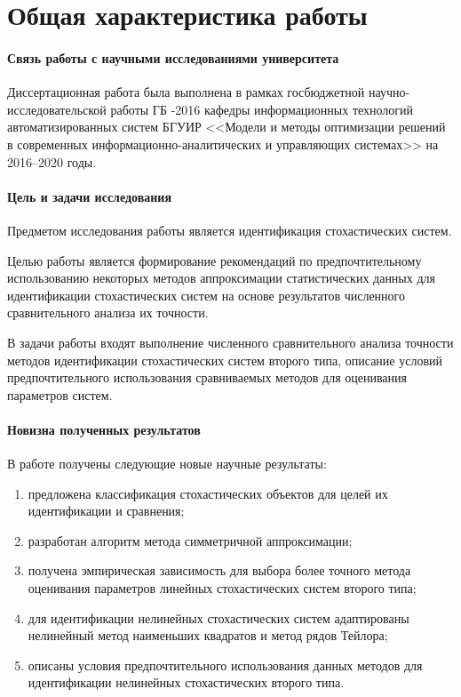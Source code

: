 \section{Общая характеристика работы}

\paragraph{Связь работы с научными исследованиями университета}
Диссертационная работа была выполнена в рамках госбюджетной
научно-исследовательской работы ГБ -2016 кафедры
информационных технологий автоматизированных систем БГУИР
<<Модели и методы оптимизации решений в современных
информационно-аналитических и управляющих системах>>
на 2016--2020 годы.

\paragraph{Цель и задачи исследования}
Предметом исследования работы является идентификация стохастических систем.

Целью работы является формирование рекомендаций по предпочтительному использованию
некоторых методов аппроксимации статистических данных для идентификации
стохастических систем на основе результатов численного сравнительного
анализа их точности.

В задачи работы входят выполнение численного сравнительного анализа
точности методов идентификации стохастических систем второго типа,
описание условий предпочтительного использования сравниваемых методов
для оценивания параметров систем.

\pagebreak
\paragraph{Новизна полученных результатов}

В работе получены следующие новые научные результаты:
\begin{enumerate}
\item предложена классификация стохастических объектов для целей их
  идентификации и сравнения;
\item разработан алгоритм метода симметричной аппроксимации;
\item получена эмпирическая зависимость для выбора более точного метода
  оценивания параметров линейных стохастических систем второго типа;
\item для идентификации нелинейных стохастических систем
  адаптированы нелинейный метод наименьших квадратов и метод рядов Тейлора;
\item описаны условия предпочтительного использования данных
  методов для идентификации нелинейных стохастических второго типа.
\end{enumerate}

